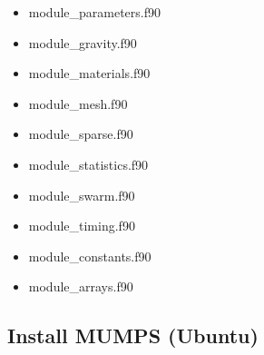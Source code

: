 \begin{itemize}
\item {\filenamefont module\_parameters.f90}\\


\item {\filenamefont module\_gravity.f90}\\


\item {\filenamefont module\_materials.f90}\\


\item {\filenamefont module\_mesh.f90}\\


\item {\filenamefont module\_sparse.f90}\\


\item {\filenamefont module\_statistics.f90}\\


\item {\filenamefont module\_swarm.f90}\\


\item {\filenamefont module\_timing.f90}\\


\item {\filenamefont module\_constants.f90}\\


\item {\filenamefont module\_arrays.f90}\\

\end{itemize}

\subsection{Install MUMPS (Ubuntu)}


